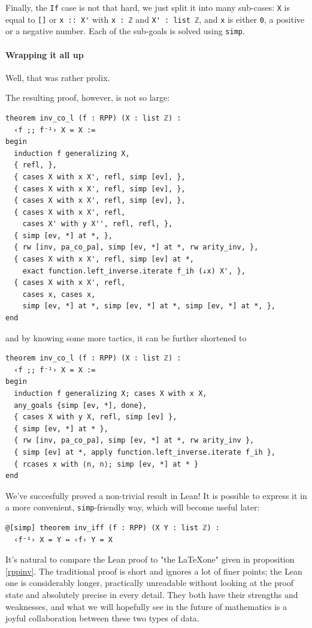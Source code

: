 \documentclass[oneside]{book}
\theoremstyle{definition}
\theoremstyle{remark}
\theoremstyle{plain}
\begin{document}
Finally, the \lstinline{If} case is not that hard,
we just split it into many sub-cases:
\lstinline{X} is equal to \lstinline{[]} or \lstinline{x :: X'} with \lstinline{x : ℤ} and \lstinline{X' : list ℤ},
and \lstinline{x} is either \lstinline{0}, a positive or a negative number.
Each of the sub-goals is solved using \lstinline{simp}.

\paragraph{Wrapping it all up}
Well, that was rather prolix.

The resulting proof, however, is not so large:
\begin{lstlisting}
theorem inv_co_l (f : RPP) (X : list ℤ) :
  ‹f ;; f⁻¹› X = X :=
begin
  induction f generalizing X,
  { refl, },
  { cases X with x X', refl, simp [ev], },
  { cases X with x X', refl, simp [ev], },
  { cases X with x X', refl, simp [ev], },
  { cases X with x X', refl,
    cases X' with y X'', refl, refl, },
  { simp [ev, *] at *, },
  { rw [inv, pa_co_pa], simp [ev, *] at *, rw arity_inv, },
  { cases X with x X', refl, simp [ev] at *,
    exact function.left_inverse.iterate f_ih (↓x) X', },
  { cases X with x X', refl,
    cases x, cases x,
    simp [ev, *] at *, simp [ev, *] at *, simp [ev, *] at *, },
end
\end{lstlisting}
and by knowing some more tactics, it can be further shortened to
\begin{lstlisting}
theorem inv_co_l (f : RPP) (X : list ℤ) :
  ‹f ;; f⁻¹› X = X :=
begin
  induction f generalizing X; cases X with x X,
  any_goals {simp [ev, *], done},
  { cases X with y X, refl, simp [ev] },
  { simp [ev, *] at * },
  { rw [inv, pa_co_pa], simp [ev, *] at *, rw arity_inv },
  { simp [ev] at *, apply function.left_inverse.iterate f_ih },
  { rcases x with ⟨n, n⟩; simp [ev, *] at * }
end
\end{lstlisting}
We've succesfully proved a non-trivial result in Lean!
It is possible to express it in a more convenient, \lstinline{simp}-friendly way, which will become useful later:
\begin{lstlisting}
@[simp] theorem inv_iff (f : RPP) (X Y : list ℤ) :
  ‹f⁻¹› X = Y ↔ ‹f› Y = X
\end{lstlisting}

It's natural to compare the Lean proof to "the \LaTeX\space one" given in proposition \ref{rppinv}.
The traditional proof is short and ignores a lot of finer points;
the Lean one is considerably longer,
practically unreadable without looking at the proof state and absolutely precise in every detail.
They both have their strengths and weaknesses,
and what we will hopefully see in the future of mathematics is a joyful collaboration between these two types of data.
\end{document}
